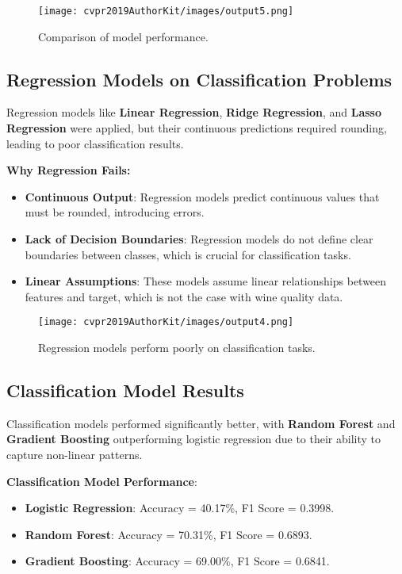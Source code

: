 \documentclass[10pt,twocolumn,letterpaper]{article}
\begin{document}
\begin{figure}[h]
    \centering
    \texttt{[image: cvpr2019AuthorKit/images/output5.png]}
    \caption{Comparison of model performance.}
\end{figure}

\subsection{Regression Models on Classification Problems}
Regression models like \textbf{Linear Regression}, \textbf{Ridge Regression}, and \textbf{Lasso Regression} were applied, but their continuous predictions required rounding, leading to poor classification results.

\textbf{Why Regression Fails:}
\begin{itemize}
    \item \textbf{Continuous Output}: Regression models predict continuous values that must be rounded, introducing errors.
    \item \textbf{Lack of Decision Boundaries}: Regression models do not define clear boundaries between classes, which is crucial for classification tasks.
    \item \textbf{Linear Assumptions}: These models assume linear relationships between features and target, which is not the case with wine quality data.
\end{itemize}

\begin{figure}[h]
    \centering
    \texttt{[image: cvpr2019AuthorKit/images/output4.png]}
    \caption{Regression models perform poorly on classification tasks.}
\end{figure}

\subsection{Classification Model Results}
Classification models performed significantly better, with \textbf{Random Forest} and \textbf{Gradient Boosting} outperforming logistic regression due to their ability to capture non-linear patterns.

\textbf{Classification Model Performance}:
\begin{itemize}
    \item \textbf{Logistic Regression}: Accuracy = 40.17\%, F1 Score = 0.3998.
    \item \textbf{Random Forest}: Accuracy = 70.31\%, F1 Score = 0.6893.
    \item \textbf{Gradient Boosting}: Accuracy = 69.00\%, F1 Score = 0.6841.
\end{itemize}
\end{document}

